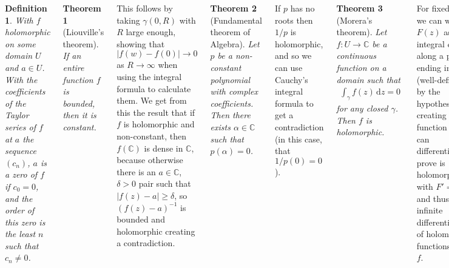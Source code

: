 \documentclass{tikzposter} %
\newtheorem{theorem}{Theorem}
\newtheorem{definition}{Definition}
\begin{document}
\begin{columns}
{  \begin{definition}
    With $f$ holomorphic on some domain $U$ and $a \in U$. With the coefficients of the Taylor series of $f$ at $a$ the sequence $(c_{n})$, $a$ is a zero of $f$ if $c_{0} = 0$, and the order of this zero is the least $n$ such that $c_{n} \neq 0$.
  \end{definition}
  \hphantom{}

  \begin{theorem}[Liouville's theorem]
    If an entire function $f$ is bounded, then it is constant.
  \end{theorem}
  \hphantom{}

  This follows by taking $\gamma(0,R)$ with $R$ large enough, showing that $|f(w)-f(0)| \to 0$ as $R \to \infty$ when using the integral formula to calculate them. We get from this the result that if $f$ is holomorphic and non-constant, then $f(\mathbb{C})$ is dense in $\mathbb{C}$, because otherwise there is an $a \in \mathbb{C}$, $\delta > 0$ pair such that $|f(z)-a| \ge \delta$, so $(f(z)-a)^{-1}$ is bounded and holomorphic creating a contradiction. \\

  \begin{theorem}[Fundamental theorem of Algebra]
    Let $p$ be a non-constant polynomial with complex coefficients. Then there exists $\alpha \in \mathbb{C}$ such that $p(\alpha) = 0$.
  \end{theorem}
  \hphantom{}

  If $p$ has no roots then $1/p$ is holomorphic, and so we can use Cauchy's integral formula to get a contradiction (in this case, that $1/p(0) = 0$). \\

  \begin{theorem}[Morera's theorem]
    Let $f : U \to \mathbb{C}$ be a continuous function on a domain such that
    \begin{align*}
      \int_{\gamma} f(z) \, \mathrm{d} z = 0
    \end{align*}
    for any closed $\gamma$. Then $f$ is holomorphic.
  \end{theorem}
  \hphantom{}

  For fixed $z_{0}$, we can write $F(z)$ as the integral of $f$ along a path ending in $z$ (well-defined by the hypothesis), creating a function we can differentiate to prove is holomorphic, with $F' = f$ and thus by infinite differentiability of holomorphic functions so is $f$. \\

}
\end{columns}
\end{document}
